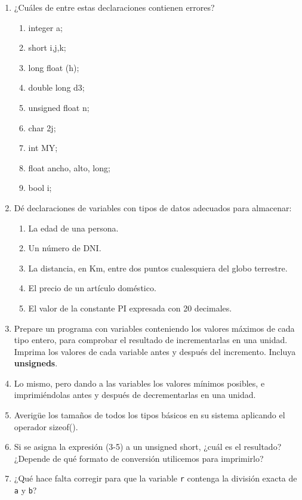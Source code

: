 \begin{enumerate}
	\item ¿Cuáles de entre estas declaraciones contienen errores?
		\begin{multicols}{2}
		\begin{enumerate}[label=\alph*.]
			\item integer a;
			\item short i,j,k;
			\item long float (h);
			\item double long d3;
			\item unsigned float n;
			\item char 2j;
			\item int MY;
			\item float ancho, alto, long;
			\item bool i;
		\end{enumerate}
		\end{multicols}
	\item Dé declaraciones de variables con tipos de datos adecuados para almacenar:
	\begin{enumerate}[label=\alph*.]
		\item La edad de una persona.
		\item Un número de DNI.
		\item La distancia, en Km, entre dos puntos cualesquiera del globo terrestre.
		\item El precio de un artículo doméstico.
		\item El valor de la constante PI expresada con 20 decimales.
	\end{enumerate}
	\item Prepare un programa con variables conteniendo los valores máximos de cada tipo entero, para
comprobar el resultado de incrementarlas en una unidad. Imprima los valores de cada variable antes y
después del incremento. Incluya \textbf{unsigneds}.
	\item Lo mismo, pero dando a las variables los valores mínimos posibles, e imprimiéndolas antes y
después de decrementarlas en una unidad.
	\item Averigüe los tamaños de todos los tipos básicos en su sistema aplicando el operador sizeof().
	\item Si se asigna la expresión (3-5) a un unsigned short, ¿cuál es el resultado? ¿Depende de qué formato de conversión utilicemos para imprimirlo?
	\item ¿Qué hace falta corregir para que la variable \texttt{r} contenga la división exacta de \texttt{a} y \texttt{b}?

\end{enumerate}
